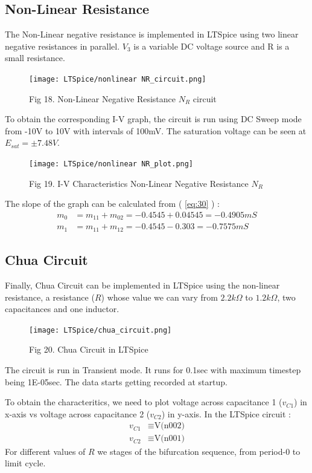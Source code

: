 \documentclass[12pt]{article}
\newcommand*{\myref}[1]{%
  \begingroup
    \hypersetup{
      linkcolor=linkequation,
      linkbordercolor=linkequation,
    }%
    \ref{#1}%
  \endgroup
}
\begin{document}
\subsection{Non-Linear Resistance}
The Non-Linear negative resistance is implemented in LTSpice using two linear negative resistances in parallel. $V_3$ is a variable DC voltage source and R is a small resistance. 
\begin{figure}[H]
	\centering
	\texttt{[image: LTSpice/nonlinear NR\_circuit.png]}
	\caption{Fig 18. Non-Linear Negative Resistance $N_R$ circuit}
\end{figure}
To obtain the corresponding I-V graph, the circuit is run using DC Sweep mode from -10V to 10V with intervals of 100mV. The saturation voltage can be seen at $E_{sat}=\pm 7.48V$. 
\begin{figure}[H]
	\centering
	\texttt{[image: LTSpice/nonlinear NR\_plot.png]}
	\caption{Fig 19. I-V Characteristics Non-Linear Negative Resistance $N_R$}
\end{figure}
The slope of the graph can be calculated from (\myref{eq:30}) :
\begin{align*}
	m_0&=m_{11}+m_{02}=-0.4545+0.04545 =-0.4905 mS \\
	m_1&=m_{11}+m_{12}=-0.4545-0.303= -0.7575mS
\end{align*}
\subsection{Chua Circuit}
Finally, Chua Circuit can be implemented in LTSpice using the non-linear resistance, a resistance ($R$) whose value we can vary from $2.2k\Omega$ to $1.2k\Omega$, two capacitances and one inductor. 
\begin{figure}[H]
	\centering
	\texttt{[image: LTSpice/chua\_circuit.png]}
	\caption{Fig 20. Chua Circuit in LTSpice}
\end{figure}
The circuit is run in Transient mode. It runs for 0.1sec with maximum timestep being 1E-05sec. The data starts getting recorded at startup. \linebreak

To obtain the characteritics, we need to plot voltage across capacitance 1 ($v_{C1}$) in x-axis vs voltage across capacitance 2 ($v_{C2}$) in y-axis. In the LTSpice circuit :
\begin{align*}
	v_{C1} &\equiv \text{V(n002)} \\
	v_{C2} &\equiv \text{V(n001)}
\end{align*}
For different values of $R$ we stages of the bifurcation sequence, from period-0 to limit cycle. \linebreak
\end{document}
